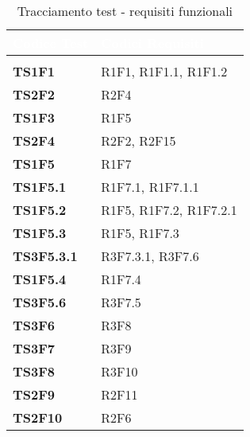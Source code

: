 \renewcommand{\arraystretch}{1.5}
\renewcommand{\arraystretch}{1.5}
\renewcommand\extrarowheight{1.5pt}
\begin{longtable}{C{2.5cm} C{10cm} } 
		\textcolor{white}{\textbf{Codice Test}} & 
		\textcolor{white}{\textbf{Codici Requisiti}} \\
		\endfirsthead
		 \\
	    \endfoot
	    \caption{Tracciamento test - requisiti funzionali}
	    \endlastfoot
		\hline
		\textbf{TS1F1} & R1F1, R1F1.1, R1F1.2 \\
		\textbf{TS2F2} & R2F4 \\
		\textbf{TS1F3} & R1F5 \\
		\textbf{TS2F4} & R2F2, R2F15 \\
		\textbf{TS1F5} &  R1F7 \\
		\textbf{TS1F5.1} & R1F7.1, R1F7.1.1 \\
		\textbf{TS1F5.2} & R1F5, R1F7.2, R1F7.2.1 \\
		\textbf{TS1F5.3} &  R1F5, R1F7.3\\
		\textbf{TS3F5.3.1} & R3F7.3.1, R3F7.6 \\
		\textbf{TS1F5.4} & R1F7.4 \\
		\textbf{TS3F5.6} & R3F7.5 \\
		\textbf{TS3F6} & R3F8 \\
		\textbf{TS3F7} & R3F9 \\
		\textbf{TS3F8} & R3F10 \\
		\textbf{TS2F9} & R2F11 \\
		\textbf{TS2F10} & R2F6 
\end{longtable}